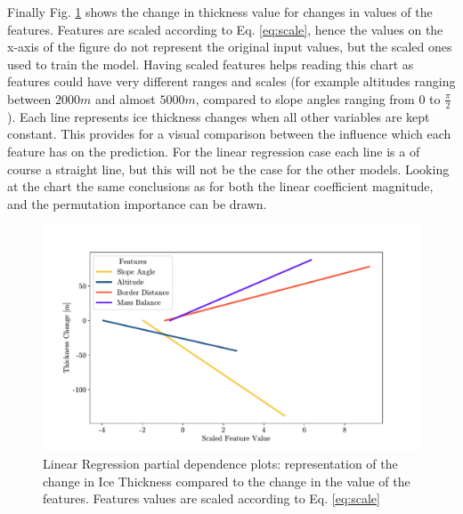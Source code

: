 Finally Fig. \ref{fig:lr-pdp} shows the change in thickness value for changes in values of the features. Features are scaled according to Eq. \ref{eq:scale}, hence the values on the x-axis of the figure do not represent the original input values, but the scaled ones used to train the model. Having scaled features helps reading this chart as features could have very different ranges and scales (for example altitudes ranging between  $2000m$ and almost $5000m$, compared to slope angles ranging from $0$ to $\frac{\pi}{2}$). Each line represents ice thickness changes when all other variables are kept constant. This provides for a visual comparison between the influence which each feature has on the prediction. For the linear regression case each line is a of course a straight line, but this will not be the case for the other models. Looking at the chart the same conclusions as for both the linear coefficient magnitude, and the permutation importance can be drawn.

\begin{figure}[!tp]
	\centering		  
	\includegraphics[width=1.\textwidth]{figures/LR_pdp.pdf}
	\caption{Linear Regression partial dependence plots: representation of the change in Ice Thickness compared to the change in the value of the features. Features values are scaled according to Eq. \ref{eq:scale}}
	\label{fig:lr-pdp}
\end{figure}

